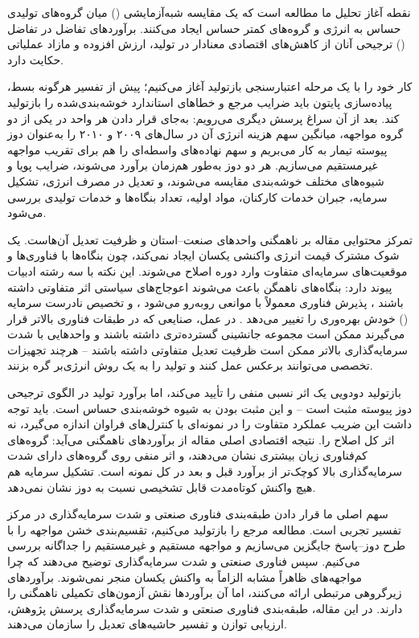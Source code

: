 \documentclass[11pt]{article}
\begin{document}
نقطه آغاز تحلیل ما مطالعه \citet{zarepour2023} است که یک مقایسه شبه‌آزمایشی () میان گروه‌های تولیدی حساس به انرژی و گروه‌های کمتر حساس ایجاد می‌کنند. برآوردهای تفاضل در تفاضل () ترجیحی آنان از کاهش‌های اقتصادی معنادار در تولید، ارزش افزوده و مازاد عملیاتی حکایت دارد.

کار خود را با یک مرحله اعتبارسنجی بازتولید آغاز می‌کنیم؛ پیش از تفسیر هرگونه بسط، پیاده‌سازی پایتون باید ضرایب مرجع و خطاهای استاندارد خوشه‌بندی‌شده را بازتولید کند. بعد از آن سراغ پرسش دیگری می‌رویم: به‌جای قرار دادن هر واحد در یکی از دو گروه مواجهه، میانگین سهم هزینه انرژی آن در سال‌های ۲۰۰۹ و ۲۰۱۰ را به‌عنوان دوز پیوسته تیمار به کار می‌بریم و سهم نهاده‌های واسطه‌ای را هم برای تقریب مواجهه غیرمستقیم می‌سازیم. هر دو دوز به‌طور هم‌زمان برآورد می‌شوند، ضرایب پویا و شیوه‌های مختلف خوشه‌بندی مقایسه می‌شوند، و تعدیل در مصرف انرژی، تشکیل سرمایه، جبران خدمات کارکنان، مواد اولیه، تعداد بنگاه‌ها و خدمات تولیدی بررسی می‌شود.

تمرکز محتوایی مقاله بر ناهمگنی واحدهای صنعت--استان و ظرفیت تعدیل آن‌هاست. یک شوک مشترک قیمت انرژی واکنشی یکسان ایجاد نمی‌کند، چون بنگاه‌ها با فناوری‌ها و موقعیت‌های سرمایه‌ای متفاوت وارد دوره اصلاح می‌شوند. این نکته با سه رشته ادبیات پیوند دارد: بنگاه‌های ناهمگن باعث می‌شوند اعوجاج‌های سیاستی اثر متفاوتی داشته باشند \cite{restuccia2008,hsieh2009}، پذیرش فناوری معمولاً با موانعی روبه‌رو می‌شود \cite{parente1994}، و تخصیص نادرست سرمایه () خودش بهره‌وری را تغییر می‌دهد \cite{david2019}. در عمل، صنایعی که در طبقات فناوری بالاتر قرار می‌گیرند ممکن است مجموعه جانشینی گسترده‌تری داشته باشند و واحدهایی با شدت سرمایه‌گذاری بالاتر ممکن است ظرفیت تعدیل متفاوتی داشته باشند -- هرچند تجهیزات تخصصی می‌توانند برعکس عمل کنند و تولید را به یک روش انرژی‌بر گره بزنند.

بازتولید دودویی یک اثر نسبی منفی را تأیید می‌کند، اما برآورد تولید در الگوی ترجیحی دوز پیوسته مثبت است -- و این مثبت بودن به شیوه خوشه‌بندی حساس است. باید توجه داشت این ضریب عملکرد متفاوت را در نمونه‌ای با کنترل‌های فراوان اندازه می‌گیرد، نه اثر کل اصلاح را. نتیجه اقتصادی اصلی مقاله از برآوردهای ناهمگنی می‌آید: گروه‌های کم‌فناوری زیان بیشتری نشان می‌دهند، و اثر منفی روی گروه‌های دارای شدت سرمایه‌گذاری بالا کوچک‌تر از برآورد قبل و بعد در کل نمونه است. تشکیل سرمایه هم هیچ واکنش کوتاه‌مدت قابل تشخیصی نسبت به دوز نشان نمی‌دهد.

سهم اصلی ما قرار دادن طبقه‌بندی فناوری صنعتی و شدت سرمایه‌گذاری در مرکز تفسیر تجربی است. مطالعه مرجع را بازتولید می‌کنیم، تقسیم‌بندی خشن مواجهه را با طرح دوز--پاسخ جایگزین می‌سازیم و مواجهه مستقیم و غیرمستقیم را جداگانه بررسی می‌کنیم. سپس فناوری صنعتی و شدت سرمایه‌گذاری توضیح می‌دهند که چرا مواجهه‌های ظاهراً مشابه الزاماً به واکنش یکسان منجر نمی‌شوند. \citet{zarepour2023} برآوردهای زیرگروهی مرتبطی ارائه می‌کنند، اما آن برآوردها نقش آزمون‌های تکمیلی ناهمگنی را دارند. در این مقاله، طبقه‌بندی فناوری صنعتی و شدت سرمایه‌گذاری پرسش پژوهش، ارزیابی توازن و تفسیر حاشیه‌های تعدیل را سازمان می‌دهند.
\end{document}
